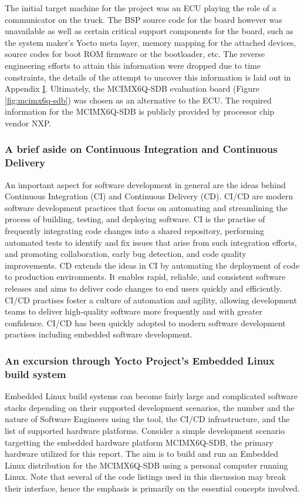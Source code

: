 The initial target machine for the project was an ECU playing the role of a communicator on the truck. The BSP source code for the board however was unavailable as well as certain critical support components for the board, such as the system maker's Yocto meta layer, memory mapping for the attached devices, source codes for boot ROM firmware or the bootloader, etc. The reverse engineering efforts to attain this information were dropped due to time constraints, the details of the attempt to uncover this information is laid out in Appendix \hyperref[rtc-c300]{I}. Ultimately, the MCIMX6Q-SDB evaluation board (Figure \ref{fig:mcimx6q-sdb}) was chosen as an alternative to the ECU. The required information for the MCIMX6Q-SDB is publicly provided by processor chip vendor NXP.

\subsubsection{A brief aside on Continuous Integration and Continuous Delivery}

An important aspect for software development in general are the ideas behind Continuous Integration (CI) and Continuous Delivery (CD). CI/CD are modern software development practices that focus on automating and streamlining the process of building, testing, and deploying software. CI is the practise of frequently integrating code changes into a shared repository, performing automated tests to identify and fix issues that arise from such integration efforts, and promoting collaboration, early bug detection, and code quality improvements. CD extends the ideas in CI by automating the deployment of code to production environments. It enables rapid, reliable, and consistent software releases and aims to deliver code changes to end users quickly and efficiently. CI/CD practises foster a culture of automation and agility, allowing development teams to deliver high-quality software more frequently and with greater confidence. CI/CD has been quickly adopted to modern software development practises including embedded software development.

\subsubsection{An excursion through Yocto Project's Embedded Linux build system}

Embedded Linux build systems can become fairly large and complicated software stacks depending on their supported development scenarios, the number and the nature of Software Engineers using the tool, the CI/CD infrastructure, and the list of supported hardware platforms. Consider a simple development scenario targetting the embedded hardware platform MCIMX6Q-SDB, the primary hardware utilized for this report. The aim is to build and run an Embedded Linux distribution for the MCIMX6Q-SDB using a personal computer running Linux. Note that several of the code listings used in this discussion may break their interface, hence the emphasis is primarily on the essential concepts involved.

